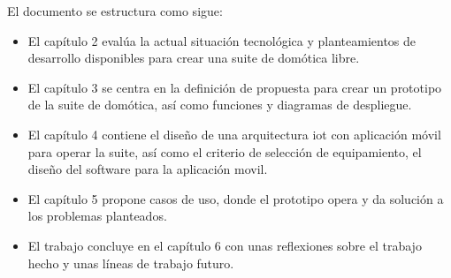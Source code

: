El documento se estructura como sigue:

\begin{itemize}
  \item El capítulo 2 evalúa la actual situación tecnológica y planteamientos de desarrollo disponibles para crear una suite de domótica libre.

  \item El capítulo 3 se centra en la definición de propuesta para crear un prototipo de la suite de domótica, así como funciones y diagramas de despliegue.

  \item El capítulo 4 contiene el diseño de una arquitectura \gls{iot} con aplicación móvil para operar la suite, así como el criterio de selección de equipamiento, el diseño del software para la aplicación movil.

  \item El capítulo 5 propone casos de uso, donde el prototipo opera y da solución a los problemas planteados.

  \item El trabajo concluye en el capítulo 6 con unas reflexiones sobre el trabajo hecho y unas líneas de trabajo futuro.

\end{itemize}
